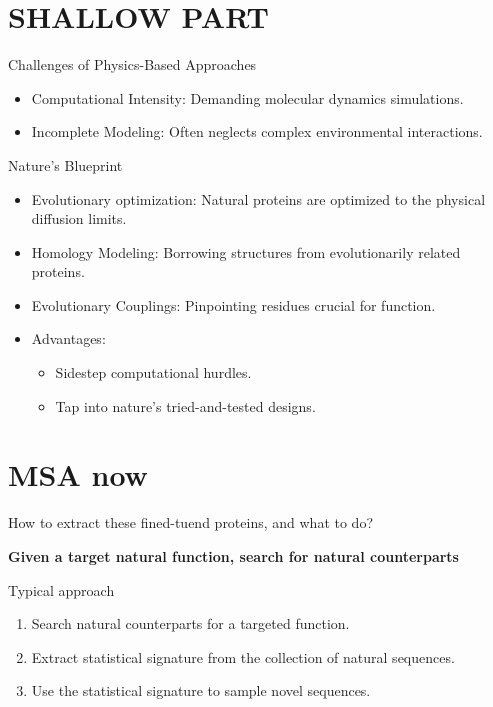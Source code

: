 \documentclass[presentation,smaller]{beamer}
\author{vopuu}
\date{\today}
\title{}
\begin{document}
\section*{SHALLOW PART}
\label{sec:orge8e0202}

\begin{frame}[label={sec:org6ce3491}]{Challenges of Physics-Based Approaches}
\begin{itemize}
\item \alert{\alert{Computational Intensity}}: Demanding molecular dynamics simulations.
\item \alert{\alert{Incomplete Modeling}}: Often neglects complex environmental interactions.
\end{itemize}
\end{frame}

\begin{frame}[label={sec:orgce5a65b}]{Nature's Blueprint}
\begin{itemize}
\item \alert{\alert{Evolutionary optimization}}: Natural proteins are optimized to the physical
diffusion limits.
\item \alert{\alert{Homology Modeling}}: Borrowing structures from evolutionarily related proteins.
\item \alert{\alert{Evolutionary Couplings}}: Pinpointing residues crucial for function.
\item \alert{\alert{Advantages}}:
\begin{itemize}
\item Sidestep computational hurdles.
\item Tap into nature's tried-and-tested designs.
\end{itemize}
\end{itemize}
\end{frame}

\section*{MSA now}
\label{sec:org9418fcf}

\begin{frame}[label={sec:orgc572c71}]{How to extract these fined-tuend proteins, and what to do?}
\begin{center}
\Large \textbf{Given a target natural function, search for natural counterparts}
\end{center}
\end{frame}

\begin{frame}[label={sec:org55818f2}]{Typical approach}
\begin{center}
\Large
\begin{enumerate}
\item Search natural counterparts for a targeted function.
\item Extract statistical signature from the collection of natural sequences.
\item Use the statistical signature to sample novel sequences.
\end{enumerate}
\end{center}
\end{frame}
\end{document}
